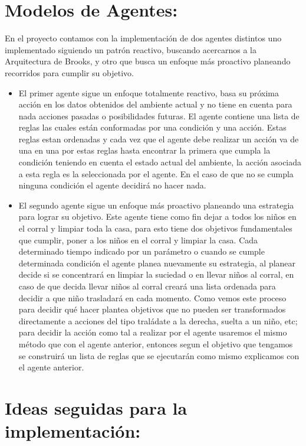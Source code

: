 \documentclass[12pt]{article}
\begin{document}
\section{Modelos de Agentes:}
En el proyecto contamos con la implementaci\'on de dos agentes distintos uno implementado siguiendo un patr\'on reactivo, buscando acercarnos a la Arquitectura de Brooks, y otro que busca un enfoque m\'as proactivo
planeando recorridos para cumplir su objetivo.
\begin{itemize}
	\item El primer agente sigue un enfoque totalmente reactivo, basa su pr\'oxima acci\'on en los datos obtenidos del ambiente actual y no tiene en cuenta para nada acciones pasadas o posibilidades futuras.
	El agente contiene una lista de reglas las cuales est\'an conformadas por una condici\'on y una acci\'on. Estas reglas estan ordenadas y cada vez que el agente debe realizar un acci\'on va de una en una por estas reglas
	hasta encontrar la primera que cumpla la condici\'on teniendo en cuenta el estado actual del ambiente, la acci\'on asociada a esta regla es la seleccionada por el agente. En el caso de que no se cumpla ninguna condici\'on el 
	agente decidir\'a no hacer nada. 

	\item El segundo agente sigue un enfoque m\'as proactivo planeando una estrategia para lograr su objetivo. Este agente tiene como fin dejar a todos los ni\~nos en el corral y limpiar toda la casa, para esto tiene dos objetivos fundamentales
	que cumplir, poner a los ni\~nos en el corral y limpiar la casa. Cada determinado tiempo indicado por un par\'ametro o cuando se cumple determinada condici\'on el agente planea nuevamente su estrategia, al planear decide si se concentrar\'a en 
	limpiar la suciedad o en llevar ni\~nos al corral, en caso de que decida llevar ni\~nos al corral crear\'a una lista ordenada para decidir a que ni\~no trasladar\'a en cada momento. Como vemos este proceso para decidir qu\'e hacer plantea objetivos que no pueden 
	ser transformados directamente a acciones del tipo tral\'adate a la derecha, suelta a un ni\~no, etc; para decidir la acci\'on como tal a realizar por el agente usaremos el mismo m\'etodo que con el agente anterior, entonces segun el objetivo que tengamos
	se construir\'a un lista de reglas que se ejecutar\'an como mismo explicamos con el agente anterior.
	
\end{itemize}

\section{Ideas seguidas para la implementaci\'on:}
\end{document}
